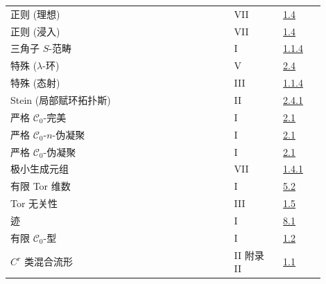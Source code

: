 \begin{longtable}{@{}>{\raggedright\arraybackslash}p{0.64\linewidth}>{\raggedright\arraybackslash}p{0.14\linewidth}>{\raggedright\arraybackslash}p{0.12\linewidth}@{}}
正则 (理想) & VII & \hyperlink{sga6.e07.def.1-4}{1.4}\\
正则 (浸入) & VII & \hyperlink{sga6.e07.def.1-4}{1.4}\\
三角子 \(S\)-范畴 & I & \hyperlink{sga6.e01.para.1-1-4}{1.1.4}\\
特殊 (\(\lambda\)-环) & V & \hyperlink{sga6.e05.def.2-4}{2.4}\\
特殊 (态射) & III & \hyperlink{sga6.e03.lem.1-1-4}{1.1.4}\\
Stein (局部赋环拓扑斯) & II & \hyperlink{sga6.e02.def.2-4-1}{2.4.1}\\
严格 \(\mathcal C_0\)-完美 & I & \hyperlink{sga6.e01.def.2-1}{2.1}\\
严格 \(\mathcal C_0\)-\(n\)-伪凝聚 & I & \hyperlink{sga6.e01.def.2-1}{2.1}\\
严格 \(\mathcal C_0\)-伪凝聚 & I & \hyperlink{sga6.e01.def.2-1}{2.1}\\
极小生成元组 & VII & \hyperlink{sga6.e07.def.1-4}{1.4.1}\\
有限 Tor 维数 & I & \hyperlink{sga6.e01.def.5-2}{5.2}\\
Tor 无关性 & III & \hyperlink{sga6.e03.def.1-5}{1.5}\\
迹 & I & \hyperlink{sga6.e01.para.8-1}{8.1}\\
有限 \(\mathcal C_0\)-型 & I & \hyperlink{sga6.e01.sec.1.2}{1.2}\\
\(C^r\) 类混合流形 & II 附录 II & \hyperlink{sga6.e02.sec.1.1}{1.1}\\
\bottomrule
\end{longtable}
\endgroup

